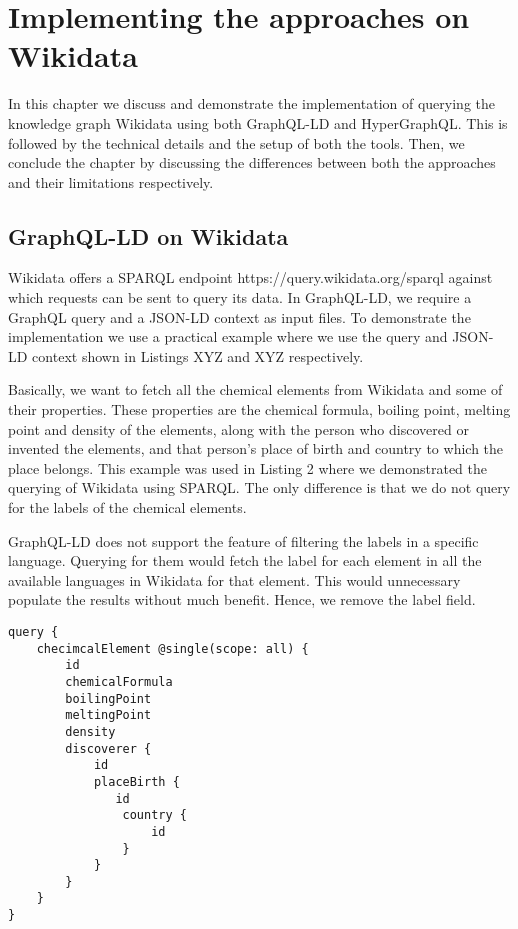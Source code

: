 \chapter{Implementing the approaches on Wikidata}

In this chapter we discuss and demonstrate the implementation of querying the knowledge graph Wikidata using both GraphQL-LD and HyperGraphQL. This is followed by the technical details and the setup of both the tools. Then, we conclude the chapter by discussing the differences between both the approaches and their limitations respectively.

\section{GraphQL-LD on Wikidata}

Wikidata offers a SPARQL endpoint https://query.wikidata.org/sparql against which requests can be sent to query its data. In GraphQL-LD, we require a GraphQL query and a JSON-LD context as input files. To demonstrate the implementation we use a practical example where we use the query and JSON-LD context shown in Listings XYZ and XYZ respectively. 

Basically, we want to fetch all the chemical elements from Wikidata and some of their properties. These properties are the chemical formula, boiling point, melting point and density of the elements, along with the person who discovered or invented the elements, and that person’s place of birth and country to which the place belongs. This example was used in Listing 2 where we demonstrated the querying of Wikidata using SPARQL. The only difference is that we do not query for the labels of the chemical elements.

GraphQL-LD does not support the feature of filtering the labels in a specific language. Querying for them would fetch the label for each element in all the available languages in Wikidata for that element. This would unnecessary populate the results without much benefit. Hence, we remove the label field.

\begin{minipage}{\linewidth}
\begin{lstlisting}[label=listing:listing17, caption={Query}]
query {
    checimcalElement @single(scope: all) {
        id 
        chemicalFormula
        boilingPoint
        meltingPoint
        density
        discoverer {
            id
            placeBirth {
               id
                country {
					id
				}
            }
        }
    }
}
\end{lstlisting}
\end{minipage}

